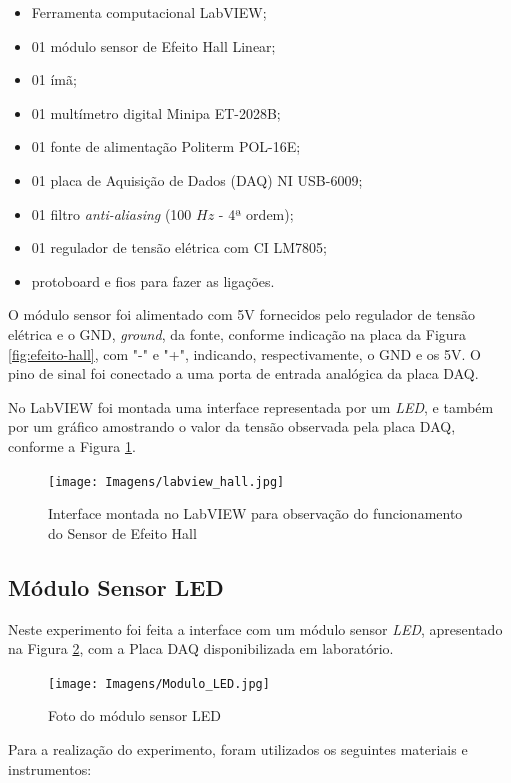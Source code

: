 \documentclass[a4paper]{instrumentacao}
\begin{document}
\begin{itemize}
	\item Ferramenta computacional LabVIEW;
	\item 01 módulo sensor de Efeito Hall Linear;
	\item 01 ímã;
	\item 01 multímetro digital Minipa ET-2028B;
	\item 01 fonte de alimentação Politerm POL-16E;
	\item 01 placa de Aquisição de Dados (DAQ) NI  USB-6009;
	\item 01 filtro \textit{anti-aliasing} (100 $Hz$ - 4ª ordem);
	\item 01 regulador de tensão elétrica com CI LM7805;
	\item protoboard e fios para fazer as ligações. 
\end{itemize}

O módulo sensor foi alimentado com 5V fornecidos pelo regulador de tensão elétrica e o GND, \textit{ground}, da fonte, conforme indicação na placa da Figura \ref{fig:efeito-hall}, com "-" e "+", indicando, respectivamente, o GND e os 5V. O pino de sinal foi conectado a uma porta de entrada analógica da placa DAQ.

No LabVIEW foi montada uma interface representada por um \textit{LED}, e também por um gráfico amostrando o valor da tensão observada pela placa DAQ, conforme a Figura \ref{fig:labview-hall}.

\begin{figure}[H]
\centering
\texttt{[image: Imagens/labview\_hall.jpg]}
\caption{Interface montada no LabVIEW para observação do funcionamento do Sensor de Efeito Hall}
\label{fig:labview-hall}
\end{figure}

\subsection{Módulo Sensor LED}
Neste experimento foi feita a interface com um módulo sensor \textit{LED}, apresentado na Figura \ref{fig:modulo-led}, com a Placa DAQ disponibilizada em laboratório.

\begin{figure}[H]
\centering
\texttt{[image: Imagens/Modulo\_LED.jpg]}
\caption{Foto do módulo sensor LED}
\label{fig:modulo-led}
\end{figure}

Para a realização do experimento, foram utilizados os seguintes materiais e instrumentos:
\end{document}
